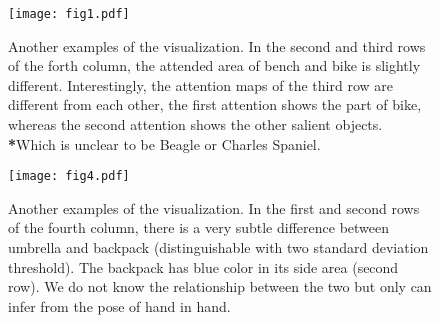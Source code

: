 \documentclass{article}
\begin{document}
\begin{figure}[t!]
  \centering
  \texttt{[image: fig1.pdf]}
  \caption{Another examples of the visualization. In the second and third rows of the forth column, the attended area of bench and bike is slightly different. Interestingly, the attention maps of the third row are different from each other, the first attention shows the part of bike, whereas the second attention shows the other salient objects. \textbf{*}Which is unclear to be Beagle or Charles Spaniel.}
  \label{fig:more1}
\end{figure}

\begin{figure}[ht]
  \centering
  \texttt{[image: fig4.pdf]}
  \caption{Another examples of the visualization. In the first and second rows of the fourth column, there is a very subtle difference between umbrella and backpack (distinguishable with two standard deviation threshold). The backpack has blue color in its side area (second row). We do not know the relationship between the two but only can infer from the pose of hand in hand.}
  \label{fig:more2}
\end{figure}
\end{document}
